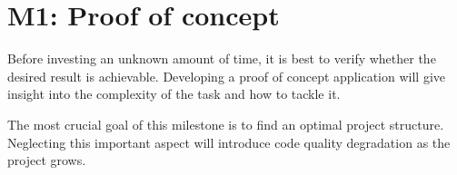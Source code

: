 \chapter{M1: Proof of concept}

Before investing an unknown amount of time, it is best to verify whether the desired result is achievable. Developing a proof of concept application will give insight into the complexity of the task and how to tackle it.

The most crucial goal of this milestone is to find an optimal project structure. Neglecting this important aspect will introduce code quality degradation as the project grows.